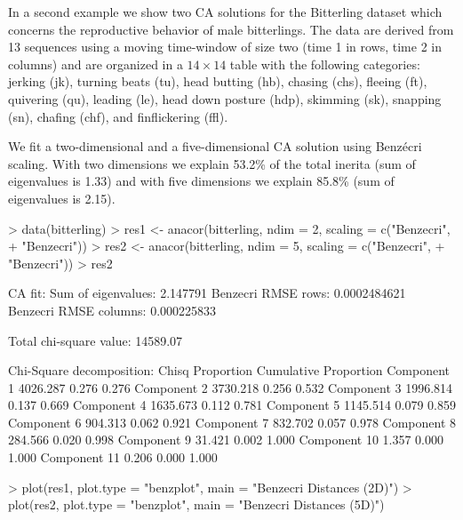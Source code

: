 \documentclass[article]{Z}
\begin{document}
In a second example we show two CA solutions for the Bitterling dataset \citep{Wiepkema:61} which concerns the reproductive behavior of male bitterlings. The data are derived from 13 sequences using a moving time-window of size two (time 1 in rows, time 2 in columns) and are organized in a $14 \times 14$ table with the following categories: jerking (jk), turning beats (tu), head butting (hb), chasing (chs), fleeing (ft), quivering (qu), leading (le), head down posture (hdp), skimming (sk), snapping (sn), chafing (chf), and finflickering (ffl). 

We fit a two-dimensional and a five-dimensional CA solution using Benz\'ecri scaling. With two dimensions we explain 53.2\% of the total inerita (sum of eigenvalues is 1.33) and with five dimensions we explain 85.8\% (sum of eigenvalues is 2.15). 

\begin{Schunk}
\begin{Sinput}
> data(bitterling)
> res1 <- anacor(bitterling, ndim = 2, scaling = c("Benzecri", 
+     "Benzecri"))
> res2 <- anacor(bitterling, ndim = 5, scaling = c("Benzecri", 
+     "Benzecri"))
> res2
\end{Sinput}
\begin{Soutput}
CA fit: 
Sum of eigenvalues:  2.147791 
Benzecri RMSE rows:  0.0002484621 
Benzecri RMSE columns:  0.000225833 

Total chi-square value: 14589.07 

Chi-Square decomposition: 
                Chisq Proportion Cumulative Proportion
Component 1  4026.287      0.276                 0.276
Component 2  3730.218      0.256                 0.532
Component 3  1996.814      0.137                 0.669
Component 4  1635.673      0.112                 0.781
Component 5  1145.514      0.079                 0.859
Component 6   904.313      0.062                 0.921
Component 7   832.702      0.057                 0.978
Component 8   284.566      0.020                 0.998
Component 9    31.421      0.002                 1.000
Component 10    1.357      0.000                 1.000
Component 11    0.206      0.000                 1.000
\end{Soutput}
\end{Schunk}

\begin{Schunk}
\begin{Sinput}
> plot(res1, plot.type = "benzplot", main = "Benzecri Distances (2D)")
> plot(res2, plot.type = "benzplot", main = "Benzecri Distances (5D)")
\end{Sinput}
\end{Schunk}
 
\end{document}
